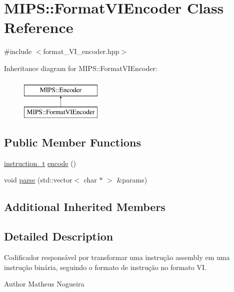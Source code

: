 \hypertarget{classMIPS_1_1FormatVIEncoder}{}\section{M\+I\+PS\+:\+:Format\+V\+I\+Encoder Class Reference}
\label{classMIPS_1_1FormatVIEncoder}


{\ttfamily \#include $<$format\+\_\+\+V\+I\+\_\+encoder.\+hpp$>$}

Inheritance diagram for M\+I\+PS\+:\+:Format\+V\+I\+Encoder\+:\begin{figure}[H]
\begin{center}
\leavevmode
\includegraphics[height=2.000000cm]{classMIPS_1_1FormatVIEncoder}
\end{center}
\end{figure}
\subsection*{Public Member Functions}
\begin{DoxyCompactItemize}
\item 
\hyperlink{core_8hpp_aa514fd240a0e29abb2a2e4c805d7f1a4}{instruction\+\_\+t} \hyperlink{classMIPS_1_1FormatVIEncoder_ae0a892a24d712d260f80dbc6e85b7090}{encode} ()
\item 
void \hyperlink{classMIPS_1_1FormatVIEncoder_a4cec696ab9deca5b957ddbab97139631}{parse} (std\+::vector$<$ char $\ast$ $>$ \&params)
\end{DoxyCompactItemize}
\subsection*{Additional Inherited Members}


\subsection{Detailed Description}
Codificador responsável por transformar uma instrução assembly em uma instrução binária, seguindo o formato de instrução no formato VI.

\begin{DoxyAuthor}{Author}
Matheus Nogueira 
\end{DoxyAuthor}


